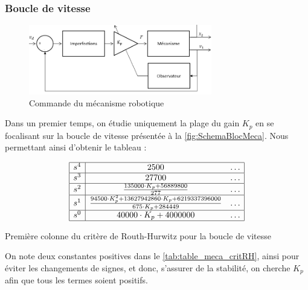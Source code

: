\documentclass[a4paper,12pt]{article}
\begin{document}
    \subsubsection{Boucle de vitesse} \label{sec:boucleVit}
    \begin{figure}[h!]
        \centering
        \includegraphics[width=8cm]{./img/cmd_meca_rob_hum_vit.png}
        \caption{Commande du mécanisme robotique}
        \label{fig:SchemaBlocMeca}
    \end{figure}
    Dans un premier temps, on étudie uniquement la plage du gain $K_p$ en se focalisant sur la boucle de vitesse présentée à la \autoref{fig:SchemaBlocMeca}. Nous permettant ainsi d'obtenir le tableau : 
    \begin{table}[ht]
        \centering
        \[
        \begin{array}{|c|c c|}
            \hline
            s^4 & 2500 & \dots \\
            \hline
            s^3 & 27700 & \dots \\
            \hline
            s^2 & \frac{135000 \cdot K_p + 56889800}{277} & \dots \\
            \hline
            s^1 & \frac{94500 \cdot K_p^2 + 13627942860 \cdot K_p + 6219337396000}{675 \cdot K_p + 284449} & \dots \\
            \hline
            s^0 & 40000 \cdot K_p + 4000000 & \dots \\
            \hline
        \end{array}
        \]
        \caption{Première colonne du critère de Routh-Hurwitz pour la boucle de vitesse}
        \label{tab:table_meca_critRH}
    \end{table}
    
    On note deux constantes positives dans le \autoref{tab:table_meca_critRH}, ainsi pour éviter les changements de signes, et donc, s'assurer de la stabilité, on cherche $K_p$ afin que tous les termes soient positifs.
    
\end{document}
